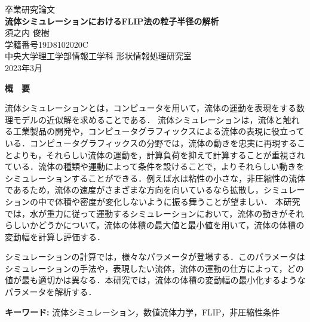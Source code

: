 \documentclass[a4j,12pt]{jreport}
\begin{document}
\thispagestyle{empty}
\begin{center}
\begin{Large}
\vspace*{0.7cm}
{\large 卒業研究論文}\\
\vspace*{2.5cm}
{\bf 流体シミュレーションにおけるFLIP法の粒子半径の解析}\\
\vspace*{7.5cm}
須之内 俊樹\\
学籍番号\hspace*{1zw}19D8102020C\\
\vspace*{2.5cm}
中央大学理工学部情報工学科\hspace*{1zw} 形状情報処理研究室\\
\vspace*{3.0cm}
2023年3月\\
\end{Large}
\end{center}


\newpage
\renewcommand{\baselinestretch}{1.25} \selectfont
{}


\begin{center} {\large \bf{概　要}} \end{center}
流体シミュレーションとは，コンピュータを用いて，流体の運動を表現をする数理モデルの近似解を求めることである．
流体シミュレーションは，流体と触れる工業製品の開発や，コンピュータグラフィックスによる流体の表現に役立っている．コンピュータグラフィックスの分野では，流体の動きを忠実に再現することよりも，それらしい流体の運動を，計算負荷を抑えて計算することが重視されている．流体の種類や運動によって条件を設けることで，よりそれらしい動きをシミュレーションすることができる．例えば水は粘性の小さな，非圧縮性の流体であるため，流体の速度がさまざまな方向を向いているなら拡散し，シミュレーションの中で体積や密度が変化しないように振る舞うことが望ましい．
本研究では，水が重力に従って運動するシミュレーションにおいて，流体の動きがそれらしいかどうかについて，流体の体積の最大値と最小値を用いて，流体の体積の変動幅を計算し評価する．

シミュレーションの計算では，様々なパラメータが登場する．このパラメータはシミュレーションの手法や，表現したい流体，流体の運動の仕方によって，どの値が最も適切かは異なる．本研究では，流体の体積の変動幅の最小化するようなパラメータを解析する．

\vspace{1zw} \noindent
{\bf キーワード: }流体シミュレーション，数値流体力学，FLIP，非圧縮性条件
\end{document}
